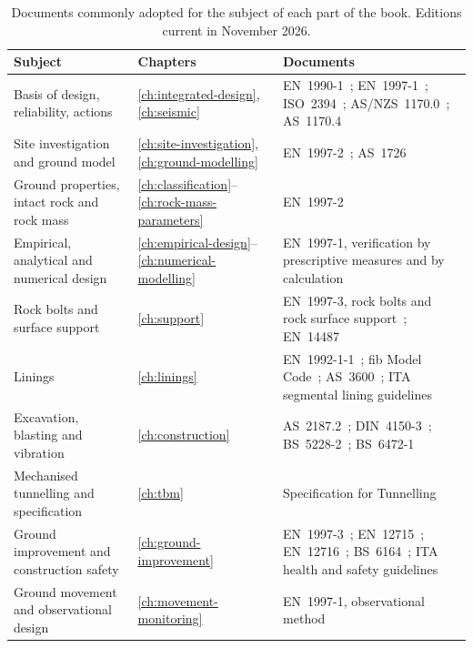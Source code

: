 \begin{table}[htbp]
\caption{Documents commonly adopted for the subject of each part of the book.
Editions current in November 2026.}
\label{tab:codes-map}
\centering
\small
\begin{tabularx}{\textwidth}{>{\raggedright\arraybackslash}p{} >{\raggedright\arraybackslash}p{} >{\raggedright\arraybackslash}X}
\toprule
\textbf{Subject} & \textbf{Chapters} & \textbf{Documents} \\
\midrule
Basis of design, reliability, actions & \ref{ch:integrated-design}, \ref{ch:seismic} & EN~1990-1~\citep{en1990part1}; EN~1997-1~\citep{en1997part1}; ISO~2394~\citep{iso2394}; AS/NZS~1170.0~\citep{asnzs1170part0}; AS~1170.4~\citep{as1170part4} \\
Site investigation and ground model & \ref{ch:site-investigation}, \ref{ch:ground-modelling} & EN~1997-2~\citep{en1997part2}; AS~1726~\citep{as1726} \\
Ground properties, intact rock and rock mass & \ref{ch:classification}--\ref{ch:rock-mass-parameters} & EN~1997-2~\citep{en1997part2} \\
Empirical, analytical and numerical design & \ref{ch:empirical-design}--\ref{ch:numerical-modelling} & EN~1997-1, verification by prescriptive measures and by calculation~\citep{en1997part1} \\
Rock bolts and surface support & \ref{ch:support} & EN~1997-3, rock bolts and rock surface support~\citep{en1997part3}; EN~14487~\citep{en14487part1,en14487part2} \\
Linings & \ref{ch:linings} & EN~1992-1-1~\citep{en1992part1}; fib Model Code~\citep{fib2024mc2020}; AS~3600~\citep{as3600}; ITA segmental lining guidelines~\citep{ita2019segmental} \\
Excavation, blasting and vibration & \ref{ch:construction} & AS~2187.2~\citep{as2187part2}; DIN~4150-3~\citep{din4150part3}; BS~5228-2~\citep{bs5228part2}; BS~6472-1~\citep{bs6472part1} \\
Mechanised tunnelling and specification & \ref{ch:tbm} & Specification for Tunnelling~\citep{bts2023spec} \\
Ground improvement and construction safety & \ref{ch:ground-improvement} & EN~1997-3~\citep{en1997part3}; EN~12715~\citep{en12715}; EN~12716~\citep{en12716}; BS~6164~\citep{bs6164}; ITA health and safety guidelines~\citep{ita2008health} \\
Ground movement and observational design & \ref{ch:movement-monitoring} & EN~1997-1, observational method~\citep{en1997part1} \\

\end{tabularx}
\end{table}
